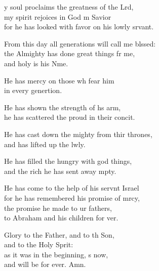 \settowidth{\versewidth}{From this day all generations will call me blessed: +}
\begin{psalmverse}%
  \begin{patverse}
y soul proclaims the greatness of the Lrd,\Flex\\
my spirit rejoices in God m Savior\Med\\
for he has looked with favor on his lowly srvant.

From this day all generations will call me blssed:\Flex\\
the Almighty has done great things fr me,\Med\\
and holy is his Nme.

He has mercy on those wh fear him\Med\\
in every genertion.

He has shown the strength of h\pointup{\i}s arm,\Med\\
he has scattered the proud in their concit.

He has cast down the mighty from thir thrones,\Med\\
and has lifted up the lwly.

He has filled the hungry with god things,\Med\\
and the rich he has sent away mpty.

He has come to the help of his servnt Israel\Med\\
for he has remembered his promise of mrcy,\\
the promise he made to ur fathers,\Med\\
to Abraham and his children for ver.

Glory to the Father, and to th Son,\Med\\
and to the Holy Sp\pointup{\i}rit:\\
as it was in the beginning, \pointup{\i}s now,\Med\\
and will be for ever. Amn.
  \end{patverse}
\end{psalmverse}
